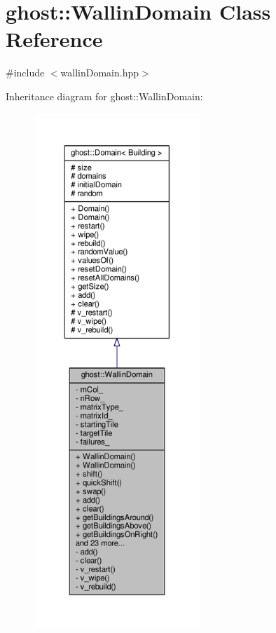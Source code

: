 \hypertarget{classghost_1_1WallinDomain}{\section{ghost\-:\-:Wallin\-Domain Class Reference}
\label{classghost_1_1WallinDomain}
}


{\ttfamily \#include $<$wallin\-Domain.\-hpp$>$}



Inheritance diagram for ghost\-:\-:Wallin\-Domain\-:
\nopagebreak
\begin{figure}[H]
\begin{center}
\leavevmode
\includegraphics[height=550pt]{classghost_1_1WallinDomain__inherit__graph}
\end{center}
\end{figure}


